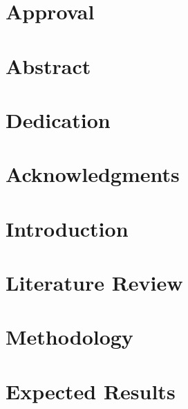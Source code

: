\documentclass[12pt]{report}
\begin{document}
\chapter*{Approval}
\label{pre:02-approval}


\chapter*{Abstract}
\label{pre:03-abstract}


\chapter*{Dedication}
\label{pre:04-dedication}




\chapter*{Acknowledgments}
\label{pre:06-acknowledgments}



\chapter{Introduction}
\label{ch:chapter-01}
 \renewcommand{\arraystretch}{1}


\chapter{Literature Review}
\label{ch:chapter-02}


\chapter{Methodology}
\label{ch:chapter-03}


\chapter{Expected Results}
\label{ch:chapter-04}







\appendix
{}
\begin{appendices}
    
\end{appendices}
\end{document}
